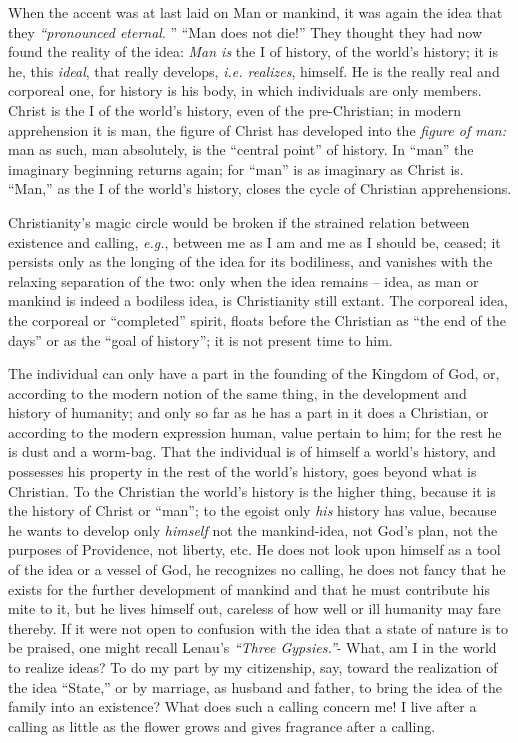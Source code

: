 \documentclass[12pt,a4paper]{book}
\begin{document}
When the accent was at last laid on Man or mankind, it was again the idea that 
they \textit{``pronounced eternal}. '' ``Man does not die!'' They thought 
they had now found the reality of the idea: \textit{Man is} the I of history, 
of the world's history; it is he, this \textit{ideal}, that really develops, 
\textit{i.e. realizes}, himself. He is the really real and corporeal one, for 
history is his body, in which individuals are only members. Christ is the I of 
the world's history, even of the pre-Christian; in modern apprehension it is 
man, the figure of Christ has developed into the \textit{figure of man:} man 
as such, man absolutely, is the ``central point'' of history. In ``man'' 
the imaginary beginning returns again; for ``man'' is as imaginary as Christ 
is. ``Man,'' as the I of the world's history, closes the cycle of Christian 
apprehensions.

Christianity's magic circle would be broken if the strained relation between 
existence and calling, \textit{e.g.}, between me as I am and me as I should 
be, ceased; it persists only as the longing of the idea for its bodiliness, 
and vanishes with the relaxing separation of the two: only when the idea 
remains -- idea, as man or mankind is indeed a bodiless idea, is Christianity 
still extant. The corporeal idea, the corporeal or ``completed'' spirit, 
floats before the Christian as ``the end of the days'' or as the ``goal of 
history''; it is not present time to him.

The individual can only have a part in the founding of the Kingdom of God, or, 
according to the modern notion of the same thing, in the development and 
history of humanity; and only so far as he has a part in it does a Christian, 
or according to the modern expression human, value pertain to him; for the 
rest he is dust and a worm-bag. That the individual is of himself a world's 
history, and possesses his property in the rest of the world's history, goes 
beyond what is Christian. To the Christian the world's history is the higher 
thing, because it is the history of Christ or ``man''; to the egoist only 
\textit{his} history has value, because he wants to develop only 
\textit{himself} not the mankind-idea, not God's plan, not the purposes of 
Providence, not liberty, etc. He does not look upon himself as a tool of the 
idea or a vessel of God, he recognizes no calling, he does not fancy that he 
exists for the further development of mankind and that he must contribute his 
mite to it, but he lives himself out, careless of how well or ill humanity may 
fare thereby. If it were not open to confusion with the idea that a state of 
nature is to be praised, one might recall Lenau's \textit{``Three 
Gypsies.''}- What, am I in the world to realize ideas? To do my part by my 
citizenship, say, toward the realization of the idea ``State,'' or by 
marriage, as husband and father, to bring the idea of the family into an 
existence? What does such a calling concern me! I live after a calling as 
little as the flower grows and gives fragrance after a calling.
\end{document}
